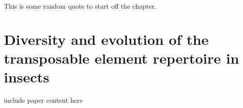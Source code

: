 \begin{savequote}[75mm]
This is some random quote to start off the chapter.
\end{savequote}

\chapter{Diversity and evolution of the transposable element
repertoire in insects}
\label{cha:mobilome}

include paper content here

